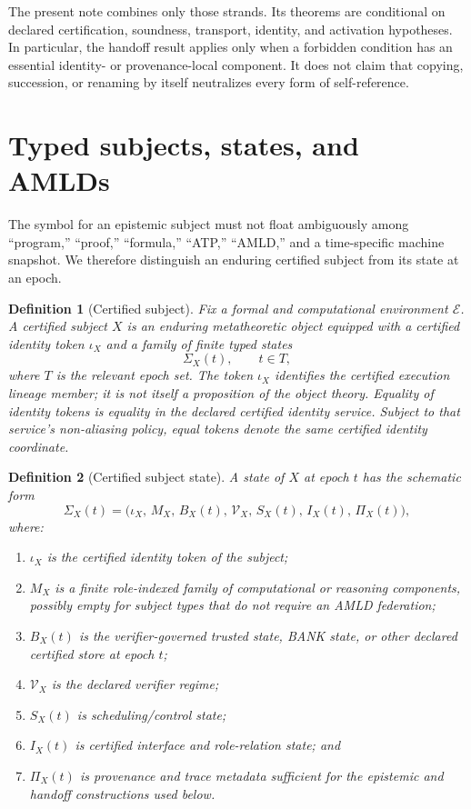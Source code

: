 \documentclass[11pt]{article}
\newtheorem{definition}{Definition}[section]
\theoremstyle{remark}
\begin{document}
The present note combines only those strands. Its theorems are conditional on declared certification, soundness, transport, identity, and activation hypotheses. In particular, the handoff result applies only when a forbidden condition has an essential identity- or provenance-local component. It does not claim that copying, succession, or renaming by itself neutralizes every form of self-reference.

\section{Typed subjects, states, and AMLDs}

The symbol for an epistemic subject must not float ambiguously among ``program,'' ``proof,'' ``formula,'' ``ATP,'' ``AMLD,'' and a time-specific machine snapshot. We therefore distinguish an enduring certified subject from its state at an epoch.

\begin{definition}[Certified subject]
Fix a formal and computational environment $\mathcal E$. A \emph{certified subject} $X$ is an enduring metatheoretic object equipped with a certified identity token $\iota_X$ and a family of finite typed states
\[
\Sigma_X(t), \qquad t\in T,
\]
where $T$ is the relevant epoch set. The token $\iota_X$ identifies the certified execution lineage member; it is not itself a proposition of the object theory. Equality of identity tokens is equality in the declared certified identity service. Subject to that service's non-aliasing policy, equal tokens denote the same certified identity coordinate.
\end{definition}

\begin{definition}[Certified subject state]
A state of $X$ at epoch $t$ has the schematic form
\[
\Sigma_X(t)=\bigl(\iota_X,\,M_X,\,B_X(t),\,\mathcal V_X,\,S_X(t),\,I_X(t),\,\Pi_X(t)\bigr),
\]
where:
\begin{enumerate}[label=(\alph*)]
\item $\iota_X$ is the certified identity token of the subject;
\item $M_X$ is a finite role-indexed family of computational or reasoning components, possibly empty for subject types that do not require an AMLD federation;
\item $B_X(t)$ is the verifier-governed trusted state, BANK state, or other declared certified store at epoch $t$;
\item $\mathcal V_X$ is the declared verifier regime;
\item $S_X(t)$ is scheduling/control state;
\item $I_X(t)$ is certified interface and role-relation state; and
\item $\Pi_X(t)$ is provenance and trace metadata sufficient for the epistemic and handoff constructions used below.
\end{enumerate}
\end{definition}
\end{document}
